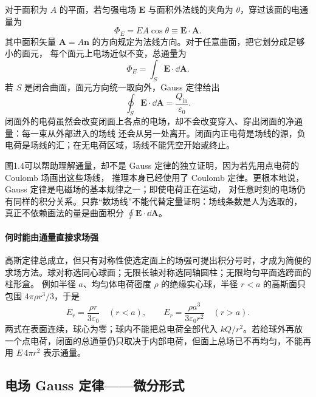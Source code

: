 对于面积为 $A$ 的平面，若匀强电场 $\boldsymbol E$ 与面积外法线的夹角为 $\theta$，穿过该面的电通量为
\begin{equation}
  \boxed{\Phi_E=EA\cos\theta\equiv\boldsymbol E\cdot\boldsymbol A}.
\end{equation}
其中面积矢量 $\boldsymbol A=A\boldsymbol n$ 的方向规定为法线方向。对于任意曲面，把它划分成足够小的面元，
每个面元上电场近似不变，总通量为
\[
  \Phi_E=\int_S\boldsymbol E\cdot\dd\boldsymbol A.
\]
若 $S$ 是闭合曲面，面元方向统一取向外，Gauss 定律给出
\begin{equation}
  \boxed{\oint_S\boldsymbol E\cdot\dd\boldsymbol A
  =\frac{Q_{\mathrm{in}}}{\varepsilon_0}}.
\end{equation}
闭面外的电荷虽然会改变闭面上各点的电场，却不会改变穿入、穿出闭面的净通量：每一束从外部进入的场线
还会从另一处离开。闭面内正电荷是场线的源，负电荷是场线的汇；在无电荷区域，场线不能凭空开始或终止。

\gaussLawFigure
{}

图1.4可以帮助理解通量，却不是 Gauss 定律的独立证明，因为若先用点电荷的 Coulomb 场画出这些场线，
推理本身已经使用了 Coulomb 定律。更根本地说，Gauss 定律是电磁场的基本规律之一；即使电荷正在运动，
对任意时刻的电场仍有同样的积分关系。只靠“数场线”不能代替定量证明：场线条数是人为选取的，
真正不依赖画法的量是曲面积分 $\oint\boldsymbol E\cdot\dd\boldsymbol A$。


\paragraph{何时能由通量直接求场强}
高斯定律总成立，但只有对称性使选定面上的场强可提出积分号时，才成为简便的求场方法。球对称选同心球面；无限长轴对称选同轴圆柱；无限均匀平面选跨面的柱形盒。
例如半径 $a$、均匀体电荷密度 $\rho$ 的绝缘实心球，半径 $r<a$ 的高斯面只包围 $4\pi\rho r^3/3$，于是
\[
 E_r=\frac{\rho r}{3\varepsilon_0}\quad(r<a),\qquad
 E_r=\frac{\rho a^3}{3\varepsilon_0r^2}\quad(r>a).
\]
两式在表面连续，球心为零；球内不能把总电荷全部代入 $kQ/r^2$。若给球外再放一个点电荷，闭面的总通量仍只取决于内部电荷，但面上总场已不再均匀，不能再用 $E\,4\pi r^2$ 表示通量。

\subsection*{电场 Gauss 定律——微分形式}

